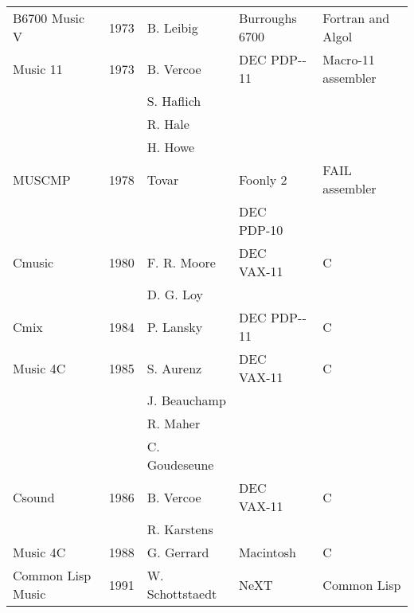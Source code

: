 \begin{table}[htbp]
\begin{tabular}{ *{5}{l} }
		B6700 Music V & 1973 & B. Leibig & Burroughs 6700 & Fortran and Algol \\
		Music 11 & 1973 & B. Vercoe & DEC PDP-­11 & Macro-­11 assembler \\
		& & S. Haflich & & \\
		& & R. Hale & & \\
		& & H. Howe & & \\
		MUSCMP & 1978 & Tovar & Foonly 2 & FAIL assembler \\
		& & & DEC PDP­-10 & \\
		Cmusic & 1980 & F. R. Moore & DEC VAX­-11 & C \\
		& & D. G. Loy & & \\
		Cmix & 1984 & P. Lansky & DEC PDP-­11 & C \\
		Music 4C & 1985 & S. Aurenz & DEC VAX­-11 & C \\
		& & J. Beauchamp & & \\
		& & R. Maher & & \\
		& & C. Goudeseune & & \\
		Csound & 1986 & B. Vercoe & DEC VAX­-11 & C \\
		& & R. Karstens & & \\
		Music 4C & 1988 & G. Gerrard & Macintosh & C \\
		Common Lisp Music & 1991 & W. Schottstaedt & NeXT & Common Lisp \\
		\hline
	\end{tabular}
\end{table}

